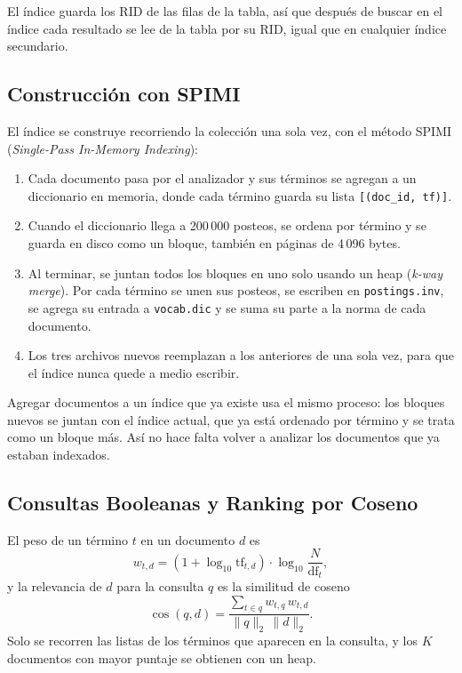 El índice guarda los RID de las filas de la tabla, así que después de buscar en
el índice cada resultado se lee de la tabla por su RID, igual que en cualquier
índice secundario.

\subsection{Construcción con SPIMI}

El índice se construye recorriendo la colección una sola vez, con el método
SPIMI (\textit{Single-Pass In-Memory Indexing}):

\begin{enumerate}
    \item Cada documento pasa por el analizador y sus términos se agregan a un
    diccionario en memoria, donde cada término guarda su lista
    \texttt{[(doc\_id, tf)]}.
    \item Cuando el diccionario llega a 200\,000 posteos, se ordena por término y
    se guarda en disco como un bloque, también en páginas de 4\,096 bytes.
    \item Al terminar, se juntan todos los bloques en uno solo usando un heap
    (\textit{k-way merge}). Por cada término se unen sus posteos, se escriben en
    \texttt{postings.inv}, se agrega su entrada a \texttt{vocab.dic} y se suma su
    parte a la norma de cada documento.
    \item Los tres archivos nuevos reemplazan a los anteriores de una sola vez,
    para que el índice nunca quede a medio escribir.
\end{enumerate}

Agregar documentos a un índice que ya existe usa el mismo proceso: los bloques
nuevos se juntan con el índice actual, que ya está ordenado por término y se
trata como un bloque más. Así no hace falta volver a analizar los documentos que
ya estaban indexados.

\subsection{Consultas Booleanas y Ranking por Coseno}

El peso de un término $t$ en un documento $d$ es
\begin{equation}
    w_{t,d} = \left(1 + \log_{10} \text{tf}_{t,d}\right) \cdot \log_{10} \frac{N}{\text{df}_t},
\end{equation}
y la relevancia de $d$ para la consulta $q$ es la similitud de coseno
\begin{equation}
    \cos(q, d) = \frac{\sum_{t \in q} w_{t,q}\, w_{t,d}}{\lVert q \rVert_2 \, \lVert d \rVert_2}.
\end{equation}
Solo se recorren las listas de los términos que aparecen en la consulta, y los
$K$ documentos con mayor puntaje se obtienen con un heap.

